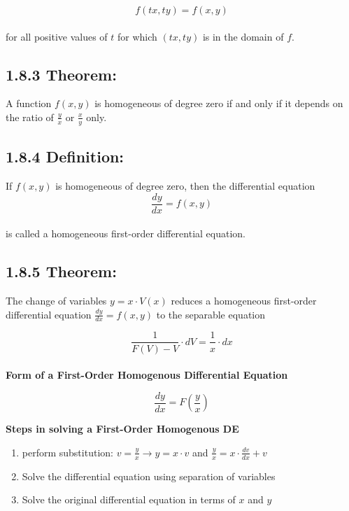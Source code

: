 \documentclass{article}
\begin{document}
\begin{flushleft}
{\[f(tx,ty) = f(x,y)\] \\

for all positive values of $t$ for which $(tx , ty)$ is in the domain of $f$.\\


\subsection*{\textbf{1.8.3 Theorem:}}
 A function $f(x,y)$ is homogeneous of degree zero if and only if it depends on the ratio of $\frac{y}{x}$ or $\frac{x}{y}$ only. \\

\subsection*{\textbf{1.8.4 Definition:}}
If $f(x,y)$ is homogeneous of degree zero, then the differential equation 
\[ \frac{dy}{dx} = f(x,y) \]\\
is called a homogeneous first-order differential equation. 

\subsection*{\textbf{1.8.5 Theorem:}}
The change of variables $ y = x \cdot V(x) $ reduces a homogeneous first-order differential equation 
$ \frac{dy}{dx} = f(x,y) $ to the separable equation 

\[\frac{1}{F(V) - V} \cdot dV = \frac{1}{x} \cdot dx \]\\

\textbf{Form of a First-Order Homogenous Differential Equation\\}

\[ \frac{dy}{dx} = F (\frac{y}{x}) \]

\textbf{Steps in solving a First-Order Homogenous DE}\\

\begin{enumerate}
\item perform substitution: $ v = \frac{y}{x} \rightarrow y = x \cdot v$ and $\frac{y}{x} = x \cdot \frac{dv}{dx} + v $
\item Solve the differential equation using separation of variables
\item Solve the original differential equation in terms of $x$ and $y$
\end{enumerate}

}
\end{flushleft}
\end{document}
